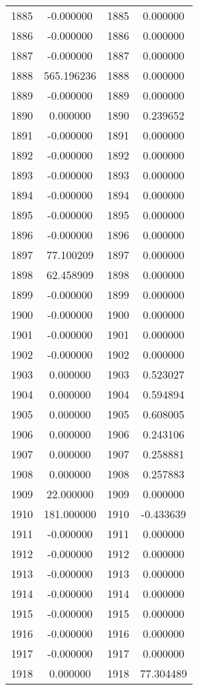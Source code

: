 \documentclass[12pt]{article}
\begin{document}
\begin{longtable}{@{}cccc@{}}
1885 & -0.000000 & 1885 & 0.000000 \\
1886 & -0.000000 & 1886 & 0.000000 \\
1887 & -0.000000 & 1887 & 0.000000 \\
1888 & 565.196236 & 1888 & 0.000000 \\
1889 & -0.000000 & 1889 & 0.000000 \\
1890 & 0.000000 & 1890 & 0.239652 \\
1891 & -0.000000 & 1891 & 0.000000 \\
1892 & -0.000000 & 1892 & 0.000000 \\
1893 & -0.000000 & 1893 & 0.000000 \\
1894 & -0.000000 & 1894 & 0.000000 \\
1895 & -0.000000 & 1895 & 0.000000 \\
1896 & -0.000000 & 1896 & 0.000000 \\
1897 & 77.100209 & 1897 & 0.000000 \\
1898 & 62.458909 & 1898 & 0.000000 \\
1899 & -0.000000 & 1899 & 0.000000 \\
1900 & -0.000000 & 1900 & 0.000000 \\
1901 & -0.000000 & 1901 & 0.000000 \\
1902 & -0.000000 & 1902 & 0.000000 \\
1903 & 0.000000 & 1903 & 0.523027 \\
1904 & 0.000000 & 1904 & 0.594894 \\
1905 & 0.000000 & 1905 & 0.608005 \\
1906 & 0.000000 & 1906 & 0.243106 \\
1907 & 0.000000 & 1907 & 0.258881 \\
1908 & 0.000000 & 1908 & 0.257883 \\
1909 & 22.000000 & 1909 & 0.000000 \\
1910 & 181.000000 & 1910 & -0.433639 \\
1911 & -0.000000 & 1911 & 0.000000 \\
1912 & -0.000000 & 1912 & 0.000000 \\
1913 & -0.000000 & 1913 & 0.000000 \\
1914 & -0.000000 & 1914 & 0.000000 \\
1915 & -0.000000 & 1915 & 0.000000 \\
1916 & -0.000000 & 1916 & 0.000000 \\
1917 & -0.000000 & 1917 & 0.000000 \\
1918 & 0.000000 & 1918 & 77.304489 \\

\end{longtable}
\end{document}
